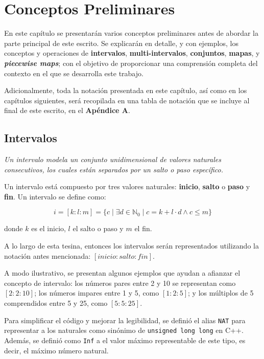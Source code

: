 \chapter{Conceptos Preliminares}\label{sec:coseptos}

En este capítulo se presentarán varios conceptos preliminares antes de abordar la parte principal de este escrito. Se explicarán en detalle, y con ejemplos, los conceptos y operaciones de \textbf{intervalos}, \textbf{multi-intervalos}, \textbf{conjuntos}, \textbf{mapas}, y \textbf{\textit{piecewise maps}}\cite{marzorati20}\cite{sbg}; con el objetivo de proporcionar una comprensión completa del contexto en el que se desarrolla este trabajo.

Adicionalmente, toda la notación presentada en este capítulo, así como en los capítulos siguientes, será recopilada en una tabla de notación que se incluye al final de este escrito, en el \textbf{Apéndice A}.


\section{Intervalos}

\begin{center}
    {\itshape Un intervalo modela un conjunto unidimensional de valores naturales consecutivos, los cuales están separados por un salto o paso específico.}
\end{center}

Un intervalo está compuesto por tres valores naturales: \textbf{inicio}, \textbf{salto} o \textbf{paso} y \textbf{fin}. Un intervalo se define como:

\[
i = [k:l:m] = \{c \mid \exists d \in \mathbb{N}_0 \mid c = k + l \cdot d \land c \leq m\}
\]

donde \( k \) es el inicio, \( l \) el salto o paso y \( m \) el fin.

 A lo largo de esta tesina, entonces los intervalos serán representados utilizando la notación antes mencionada: \([inicio : salto : fin]\).

A modo ilustrativo, se presentan algunos ejemplos que ayudan a afianzar el concepto de intervalo: los números pares entre 2 y 10 se representan como \([2 : 2 : 10]\); los números impares entre 1 y 5, como \([1 : 2 : 5]\); y los múltiplos de 5 comprendidos entre 5 y 25, como \([5 : 5 : 25]\).

Para simplificar el código y mejorar la legibilidad, se definió el alias \texttt{NAT} para representar a los naturales como sinónimo de \texttt{unsigned long long} en C++. Además, se definió como \texttt{Inf} a el valor máximo representable de este tipo, es decir, el máximo número natural.

